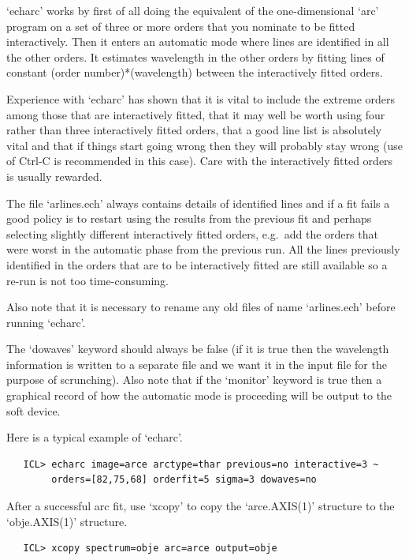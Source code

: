 \documentclass[11pt,twoside]{article}
\begin{document}
   `echarc' works by first of all doing the equivalent of the
   one-dimensional `arc' program on a set of three or more orders that
   you nominate to be fitted interactively. Then it enters an automatic
   mode where lines are identified in all the other orders. It estimates
   wavelength in the other orders by fitting lines of constant
   (order number)*(wavelength) between the interactively fitted orders.

   Experience with `echarc' has shown that it is vital to include the
   extreme orders among those that are interactively fitted, that it may
   well be worth using four rather than three interactively fitted
   orders, that a good line list is absolutely vital and that if things
   start going wrong then they will probably stay wrong (use of Ctrl-C
   is recommended in this case). Care with the interactively fitted
   orders is usually rewarded.

   The file `arlines.ech' always contains details of identified lines
   and if a fit fails a good policy is to restart using the results from
   the previous fit and perhaps selecting slightly different
   interactively fitted orders, e.g.\ add the orders that were worst in
   the automatic phase from the previous run. All the lines previously
   identified in the orders that are to be interactively fitted are
   still available so a re-run is not too time-consuming.

   Also note that it is necessary to rename any old files of name
   `arlines.ech' before running `echarc'.

   The `dowaves' keyword should always be false (if it is true then the
   wavelength information is written to a separate file and we want it
   in the input file for the purpose of scrunching). Also note that if
   the `monitor' keyword is true then a graphical record of how the
   automatic mode is proceeding will be output to the soft device.

   Here is a typical example of `echarc'.

\begin{verbatim}
   ICL> echarc image=arce arctype=thar previous=no interactive=3 ~
        orders=[82,75,68] orderfit=5 sigma=3 dowaves=no
\end{verbatim}

   After a successful arc fit, use `xcopy' to copy the `arce.AXIS(1)'
   structure to the `obje.AXIS(1)' structure.

\begin{verbatim}
   ICL> xcopy spectrum=obje arc=arce output=obje
\end{verbatim}
\end{document}
